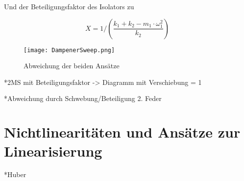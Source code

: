 Und der Beteiligungsfaktor des Isolators zu

\begin{equation*}
X = 1/\left( \frac{k_1 + k_2 - m_1 \cdot \omega_1^2}{k_2} \right)
\end{equation*}

\begin{figure}[ht] 
    \centering
    \texttt{[image: DampenerSweep.png]}
    \caption{Abweichung der beiden Ansätze}
    \label{fig:Bemessungsspektrum}
\end{figure}

*2MS mit Beteiligungsfaktor  -> Diagramm mit Verschiebung = 1

*Abweichung durch Schwebung/Beteiligung 2. Feder 

\pagebreak

\section{Nichtlinearitäten und Ansätze zur Linearisierung}
\label{sec:nichtlinearitaten}

*Huber

\pagebreak